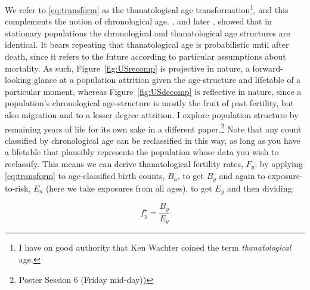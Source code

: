 \documentclass{article}
\begin{document}
We refer to \eqref{eq:transform} as the thanatological age
transformation\footnote{I have on good authority that Ken Wachter
coined the term \textit{thanatological} age.}, and this complements the notion
of chronological age. \citep{brouard1989mouvements}, and later
\citep{vaupel2009life}, showed that in stationary populations the chronological
and thanatological age structures are identical.
It bears repeating that thanatological age is probabilistic until after death, since it refers to the future according to
particular assumptions about mortality. As such, Figure~\ref{fig:USrecomp} is
projective in nature, a forward-looking glance at a population attrition given the age-structure and
lifetable of a particular moment, whereas Figure~\ref{fig:USdecomp} is reflective in nature, since a population's
chronological age-structure is mostly the fruit of past fertility, but also
migration and to a lesser degree attrition. I explore population structure by remaining years of life
for its own sake in a different paper.\footnote{Poster Session 6 (Friday
mid-day))} Note that any count classified by chronological age can be
reclassified in this way, as long as you have a lifetable that plausibly represents the population whose data you wish to reclassify. This means we can derive thanatological fertility rates, $F_y$, by applying \eqref{eq:transform}
to age-classified birth counts, $B_a$, to get $B_y$ and again to
exposure-to-risk, $E_a$ (here we take exposures from all ages), to get $E_y$ and then dividing:

\begin{equation}
f^\star_y = \frac{B_y}{E_y}
\end{equation}
\end{document}
